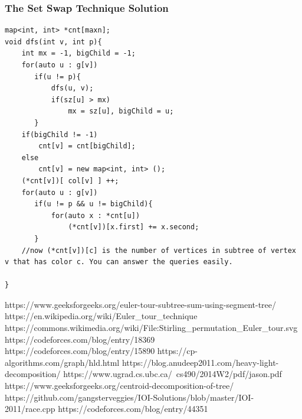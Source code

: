 \documentclass[12pt]{article}
\begin{document}
\subsubsection{The Set Swap Technique Solution}


\begin{verbatim}
map<int, int> *cnt[maxn];
void dfs(int v, int p){
    int mx = -1, bigChild = -1;
    for(auto u : g[v])
       if(u != p){
           dfs(u, v);
           if(sz[u] > mx)
               mx = sz[u], bigChild = u;
       }
    if(bigChild != -1)
        cnt[v] = cnt[bigChild];
    else
        cnt[v] = new map<int, int> ();
    (*cnt[v])[ col[v] ] ++;
    for(auto u : g[v])
       if(u != p && u != bigChild){
           for(auto x : *cnt[u])
               (*cnt[v])[x.first] += x.second;
       }
    //now (*cnt[v])[c] is the number of vertices in subtree of vertex v that has color c. You can answer the queries easily.

}
\end{verbatim}

\begin{thebibliography}{9}

https://www.geeksforgeeks.org/euler-tour-subtree-sum-using-segment-tree/
https://en.wikipedia.org/wiki/Euler\_tour\_technique
https://commons.wikimedia.org/wiki/File:Stirling\_permutation\_Euler\_tour.svg
https://codeforces.com/blog/entry/18369
https://codeforces.com/blog/entry/15890
https://cp-algorithms.com/graph/hld.html
https://blog.anudeep2011.com/heavy-light-decomposition/
https://www.ugrad.cs.ubc.ca/~cs490/2014W2/pdf/jason.pdf
https://www.geeksforgeeks.org/centroid-decomposition-of-tree/
https://github.com/gangsterveggies/IOI-Solutions/blob/master/IOI-2011/race.cpp
https://codeforces.com/blog/entry/44351

\end{thebibliography}        
\end{document}

